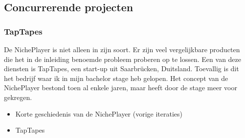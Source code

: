 \subsection{Concurrerende projecten}
\subsubsection*{TapTapes}
De NichePlayer is niet alleen in zijn soort. Er zijn veel vergelijkbare producten die het in de inleiding benoemde probleem proberen op te lossen. Een van deze diensten is TapTapes, een start-up uit Saarbrücken, Duitsland. Toevallig is dit het bedrijf waar ik in mijn bachelor stage heb gelopen. Het concept van de NichePlayer bestond toen al enkele jaren, maar heeft door de stage meer voor gekregen.

\begin{itemize}
    \item Korte geschiedenis van de NichePlayer (vorige iteraties)
    \item TapTapes
\end{itemize}
